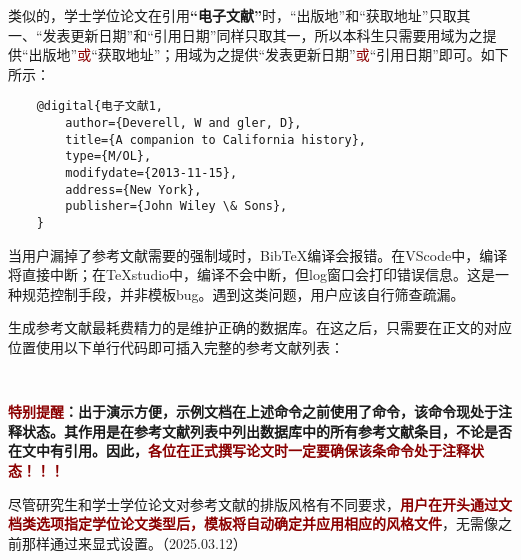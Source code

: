 \documentclass[print, doctor, vlined]{DissertUESTC}
\begin{document}
	类似的，学士学位论文在引用\textbf{“电子文献”}时，“出版地”和“获取地址”只取其一、“发表更新日期”和“引用日期”同样只取其一，所以本科生只需要用域为之提供“出版地”\textcolor{DarkRed}{或}“获取地址”；用域为之提供“发表更新日期”\textcolor{DarkRed}{或}“引用日期”即可。如下所示：
	\begin{verbatim}
	@digital{电子文献1,
	    author={Deverell, W and gler, D},
	    title={A companion to California history},
	    type={M/OL},
	    modifydate={2013-11-15},
	    address={New York},
	    publisher={John Wiley \& Sons},
	}
	\end{verbatim}

	

	当用户漏掉了参考文献需要的强制域时，BibTeX编译会报错。在VScode中，编译将直接中断；在TeXstudio中，编译不会中断，但log窗口会打印错误信息。这是一种规范控制手段，并非模板bug。遇到这类问题，用户应该自行筛查疏漏。
	
	生成参考文献最耗费精力的是维护正确的数据库。在这之后，只需要在正文的对应位置使用以下单行代码即可插入完整的参考文献列表：
	\begin{verbatim}
		
	\end{verbatim}
	
	\textbf{\textcolor{DarkRed}{特别提醒}：出于演示方便，示例文档在上述命令之前使用了命令，该命令现处于注释状态。其作用是在参考文献列表中列出数据库中的所有参考文献条目，不论是否在文中有引用。因此，\textcolor{DarkRed}{各位在正式撰写论文时一定要确保该条命令处于注释状态！！！}}
	
	尽管研究生和学士学位论文对参考文献的排版风格有不同要求，\textbf{\textcolor{DarkRed}{用户在开头通过文档类选项指定学位论文类型后，模板将自动确定并应用相应的风格文件}}，无需像之前那样通过来显式设置。（2025.03.12）
	
\end{document}
